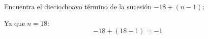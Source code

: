Encuentra el dieciochoavo término de la sucesión $-18+(n-1)$:

\begin{solutionbox}{1.6cm}
    Ya que $n=18$:
    \[-18+(18-1)=-1\]
\end{solutionbox}
